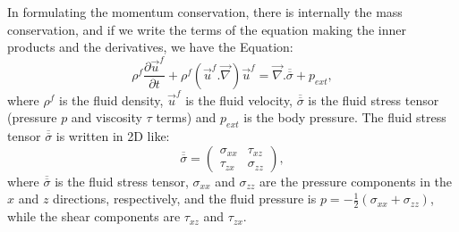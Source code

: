     In formulating the momentum conservation, there is internally the mass conservation, and if we write the terms of the equation making the inner products and the derivatives, we have the Equation: 
\begin{equation}
    \rho^{f} \frac{\partial \vec{u}^{f}}{\partial t} +\rho^{f}\left(\vec{u}^{f}.\vec{\nabla}\right)\vec{u}^{f} = \vec{\nabla}.\overline{\overline{\sigma}} +p_{ext},
    \label{equ:Navier-Stokes}
\end{equation}
where $\rho^{f}$ is the fluid density, $\vec{u}^{f}$ is the fluid velocity, $\overline{\overline{\sigma}}$ is the fluid stress tensor (pressure $p$ and viscosity $\tau$ terms) and $p_{ext}$ is the body pressure. The fluid stress tensor $\overline{\overline{\sigma}}$ is written in 2D like:
\begin{equation}
    \overline{\overline{\sigma}} = \left(
    \begin{matrix}
        \sigma_{xx} & \tau_{xz} \\
        \tau_{zx} & \sigma_{zz}
    \end{matrix}
    \right),
    \label{equ:tensor_tensao}
\end{equation}
where $\overline{\overline{\sigma}}$ is the fluid stress tensor, $\sigma_{xx}$ and $\sigma_{zz}$ are the pressure components in the $x$ and $z$ directions, respectively, and the fluid pressure is $p=-\frac{1}{2}(\sigma_{xx}+\sigma_{zz})$, while the shear components are $\tau_{xz}$ and $\tau_{zx}$.

